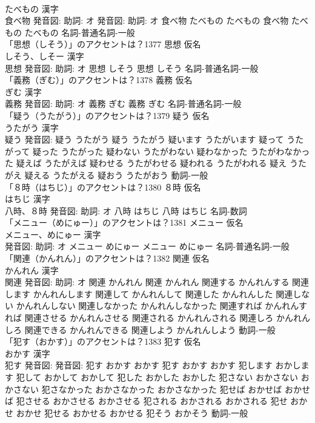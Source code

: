 \documentclass[8pt]{extreport}
\begin{document}
\begin{CJK}{UTF8}{min}
\\	たべもの 漢字　
\\	食べ物 発音図: 助詞: オ 発音図: 助詞: オ	食べ物 たべもの たべもの		食べ物 たべもの たべもの				名詞-普通名詞-一般 
\\	「思想（しそう）」のアクセントは？1377	思想 仮名　
\\	しそう、しそー 漢字　
\\	思想 発音図: 助詞: オ	思想 しそう		思想 しそう				名詞-普通名詞-一般 
\\	「義務（ぎむ）」のアクセントは？1378	義務 仮名　
\\	ぎむ 漢字　
\\	義務 発音図: 助詞: オ	義務 ぎむ		義務 ぎむ				名詞-普通名詞-一般 
\\	「疑う（うたがう）」のアクセントは？1379	疑う 仮名　
\\	うたがう 漢字　
\\	疑う 発音図:	疑う うたがう		疑う うたがう 疑います うたがいます 疑って うたがって 疑った うたがった 疑わない うたがわない 疑わなかった うたがわなかった 疑えば うたがえば 疑わせる うたがわせる 疑われる うたがわれる 疑え うたがえ 疑える うたがえる 疑おう うたがおう				動詞-一般 
\\	「８時（はちじ）」のアクセントは？1380	８時 仮名　
\\	はちじ 漢字　
\\	八時、８時 発音図: 助詞: オ	八時 はちじ		八時 はちじ				名詞-数詞 
\\	「メニュー（めにゅー）」のアクセントは？1381	メニュー 仮名　
\\	メニュー、めにゅー 漢字　
\\	発音図: 助詞: オ	メニュー めにゅー		メニュー めにゅー				名詞-普通名詞-一般 
\\	「関連（かんれん）」のアクセントは？1382	関連 仮名　
\\	かんれん 漢字　
\\	関連 発音図: 助詞: オ	関連 かんれん		関連 かんれん 関連する かんれんする 関連します かんれんします 関連して かんれんして 関連した かんれんした 関連しない かんれんしない 関連しなかった かんれんしなかった 関連すれば かんれんすれば 関連させる かんれんさせる 関連される かんれんされる 関連しろ かんれんしろ 関連できる かんれんできる 関連しよう かんれんしよう				動詞-一般 
\\	「犯す（おかす）」のアクセントは？1383	犯す 仮名　
\\	おかす 漢字　
\\	犯す 発音図: 発音図:	犯す おかす おかす		犯す おかす おかす 犯します おかします 犯して おかして おかして 犯した おかした おかした 犯さない おかさない おかさない 犯さなかった おかさなかった おかさなかった 犯せば おかせば おかせば 犯させる おかさせる おかさせる 犯される おかされる おかされる 犯せ おかせ おかせ 犯せる おかせる おかせる 犯そう おかそう				動詞-一般 

\end{CJK}
\end{document}

